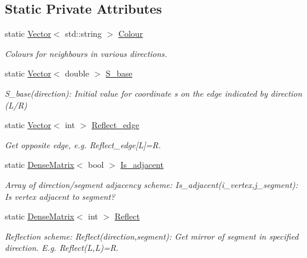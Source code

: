 \subsection*{Static Private Attributes}
\begin{DoxyCompactItemize}
\item 
static \hyperlink{classoomph_1_1Vector}{Vector}$<$ std\+::string $>$ \hyperlink{classoomph_1_1BinaryTree_a14b12263ce207c5ab343cd2bc971b983}{Colour}
\begin{DoxyCompactList}\small\item\em Colours for neighbours in various directions. \end{DoxyCompactList}\item 
static \hyperlink{classoomph_1_1Vector}{Vector}$<$ double $>$ \hyperlink{classoomph_1_1BinaryTree_a0071402257f6137a0bb19dd702665a92}{S\+\_\+base}
\begin{DoxyCompactList}\small\item\em S\+\_\+base(direction)\+: Initial value for coordinate s on the edge indicated by direction (L/R) \end{DoxyCompactList}\item 
static \hyperlink{classoomph_1_1Vector}{Vector}$<$ int $>$ \hyperlink{classoomph_1_1BinaryTree_af44e99a31403858e88fe62294eb40770}{Reflect\+\_\+edge}
\begin{DoxyCompactList}\small\item\em Get opposite edge, e.\+g. Reflect\+\_\+edge\mbox{[}L\mbox{]}=R. \end{DoxyCompactList}\item 
static \hyperlink{classoomph_1_1DenseMatrix}{Dense\+Matrix}$<$ bool $>$ \hyperlink{classoomph_1_1BinaryTree_ae8d579bfff3e2b7b3c344b6839aaa9f3}{Is\+\_\+adjacent}
\begin{DoxyCompactList}\small\item\em Array of direction/segment adjacency scheme\+: Is\+\_\+adjacent(i\+\_\+vertex,j\+\_\+segment)\+: Is vertex adjacent to segment? \end{DoxyCompactList}\item 
static \hyperlink{classoomph_1_1DenseMatrix}{Dense\+Matrix}$<$ int $>$ \hyperlink{classoomph_1_1BinaryTree_aa039fcc5eb37f101d449582af4be33fc}{Reflect}
\begin{DoxyCompactList}\small\item\em Reflection scheme\+: Reflect(direction,segment)\+: Get mirror of segment in specified direction. E.\+g. Reflect(\+L,\+L)=R. \end{DoxyCompactList}\end{DoxyCompactItemize}
